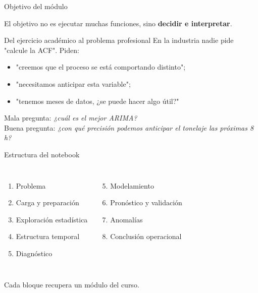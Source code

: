 



\begin{frame}{Objetivo del módulo}

El objetivo no es ejecutar muchas funciones, sino \textbf{decidir e interpretar}.
\end{frame}

\begin{frame}{Del ejercicio académico al problema profesional}
En la industria nadie pide "calcule la ACF". Piden:
\begin{itemize}
  \item "creemos que el proceso se está comportando distinto";
  \item "necesitamos anticipar esta variable";
  \item "tenemos meses de datos, ¿se puede hacer algo útil?"
\end{itemize}
\vfill
Mala pregunta: \emph{¿cuál es el mejor ARIMA?}\\
Buena pregunta: \emph{¿con qué precisión podemos anticipar el tonelaje las próximas 8 h?}
\end{frame}

\begin{frame}{Estructura del notebook}
\begin{columns}[T]
\begin{enumerate}
  \item[0.] Problema
  \item Carga y preparación
  \item Exploración estadística
  \item Estructura temporal
  \item Diagnóstico
\end{enumerate}
\begin{enumerate}
  \setcounter{enumi}{4}
  \item Modelamiento
  \item Pronóstico y validación
  \item Anomalías
  \item Conclusión operacional
\end{enumerate}
\end{columns}
\vfill
Cada bloque recupera un módulo del curso.
\end{frame}

